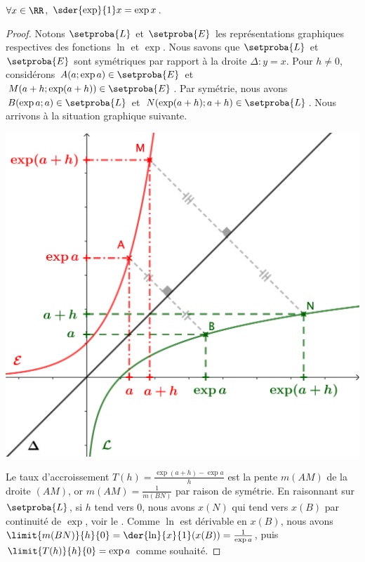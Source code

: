 \begin{fact}
	$\forall x \in \RR$,
	$\sder{\exp}{1} x = \exp x$.
\end{fact}


\begin{proof}
	Notons $\setproba{L}$ et $\setproba{E}$ les représentations graphiques respectives des fonctions $\ln$ et $\exp$.
	Nous savons que $\setproba{L}$ et $\setproba{E}$ sont symétriques par rapport à la droite $\Delta: y = x$.
	Pour $h \neq 0$, considérons 
	$A(a ; \exp a) \in \setproba{E}$ et $M(a+h ; \exp(a+h)) \in \setproba{E}$.
	Par symétrie, nous avons
	$B(\exp a ; a) \in \setproba{L}$ et $N(\exp(a+h) ; a+h) \in \setproba{L}$.
	Nous arrivons à la situation graphique suivante.

	\begin{center}
		\includegraphics[scale=.85]{content/exp/eq-diff.png}
	\end{center}
	
	Le taux d'accroissement $T(h) = \frac{\exp(a+h) - \exp a}{h}$ est la pente $m(AM)$ de la droite $(AM)$, or $m(AM) = \frac{1}{m(BN)}$ par raison de symétrie.
	En raisonnant sur $\setproba{L}$, si $h$ tend vers $0$, nous avons $x(N)$ qui tend vers $x(B)$ par continuité de $\exp$, voir le .
	Comme $\ln$ est dérivable en $x(B)$, nous avons
	$\limit{m(BN)}{h}{0} = \der{\ln}{x}{1}(x(B)) = \frac{1}{\exp a}$,
	puis
	$\limit{T(h)}{h}{0} = \exp a$
	comme souhaité.
\end{proof}
